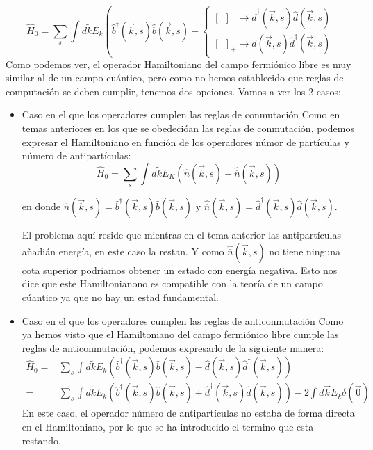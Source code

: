 $$
\hat{H}_0=\sum_s \int d \tilde{k} E_k\left(\hat{b}^{\dagger}(\vec{k}, s) \hat{b}(\vec{k}, s)-\left\{\begin{array}{l}
{[~~]_-} \rightarrow \hat{d}^{\dagger}(\vec{k}, s) \hat{d}(\vec{k}, s)\\
{[~~]_+} \rightarrow \hat{d}(\vec{k}, s) \hat{d}^{\dagger}(\vec{k}, s)
\end{array} \right.\right.
$$
Como podemos ver, el operador Hamiltoniano del campo fermiónico libre es muy similar al de un campo cuántico, pero como no hemos establecido que reglas de computación se deben cumplir, tenemos dos opciones. Vamos a ver los 2 casos:
\begin{itemize}
  \item Caso en el que los operadores cumplen las reglas de conmutación 
  Como en temas anteriores en los que se obedecióan las reglas de conmutación, podemos expresar el Hamiltoniano en función de los operadores númor de partículas y número de antipartículas:
  $$
\hat{H}_0=\sum_s \int d \tilde{k} E_K(\hat{n}(\vec{k}, s)-\hat{\overline{n}}(\vec{k}, s))
$$ 

en donde $\hat{n}(\vec{k}, s)=\hat{b}^{\dagger}(\vec{k}, s) \hat{b}(\vec{k}, s)$ y $\hat{\overline{n}}(\vec{k}, s)=\hat{d}^{\dagger}(\vec{k}, s) \hat{d}(\vec{k}, s)$. 

El problema aquí reside que mientras en el tema anterior las antipartículas añadián energía, en este caso la restan. Y como $\hat{\overline{n}}(\vec{k}, s)$ no tiene ninguna cota superior podriamos obtener un estado con energía negativa. Esto nos dice que este Hamiltonianono es compatible con la teoría de un campo cúantico ya que no hay un estad fundamental. 

  \item Caso en el que los operadores cumplen las reglas de anticonmutación 
  Como ya hemos visto que el Hamiltoniano del campo fermiónico libre cumple las reglas de anticonmutación, podemos expresarlo de la siguiente manera:
  $$
  \begin{array}{ll}
    \hat{H}_0= &\sum_s \int d \tilde{k} E_k\left(\hat{b}^{\dagger}(\vec{k}, s) \hat{b}(\vec{k}, s)-\hat{d}(\vec{k}, s) \hat{d}^{\dagger}(\vec{k}, s)\right) \\
    =&\sum_s \int d \tilde{k} E_k\left(\hat{b}^{\dagger}(\vec{k}, s) \hat{b}(\vec{k}, s)+\hat{d}^{\dagger}(\vec{k}, s) \hat{d}(\vec{k}, s)\right)-2 \int d \vec{k} E_k \delta(\vec{0})
  \end{array}
$$
En este caso, el operador número de antipartículas no estaba de forma directa en el Hamiltoniano, por lo que se ha introducido el termino que esta restando.

\end{itemize}

